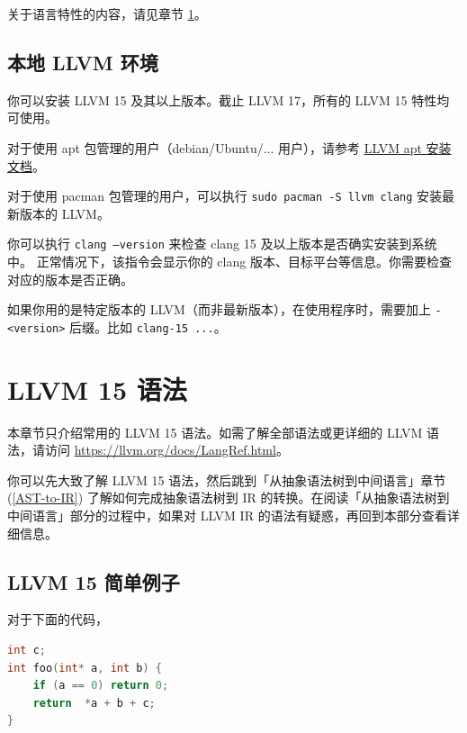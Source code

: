 关于语言特性的内容，请见章节 \ref{LLVM-semantic}。

\subsection{本地 LLVM 环境}

你可以安装 LLVM 15 及其以上版本。截止 LLVM 17，所有的 LLVM 15 特性均可使用。

对于使用 apt 包管理的用户（debian/Ubuntu/... 用户），请参考 \href{https://apt.llvm.org/}{LLVM apt 安装文档}。

对于使用 pacman 包管理的用户，可以执行 \texttt{sudo pacman -S llvm clang} 安装最新版本的 LLVM。

你可以执行 \texttt{clang --version} 来检查 clang 15 及以上版本是否确实安装到系统中。
正常情况下，该指令会显示你的 clang 版本、目标平台等信息。你需要检查对应的版本是否正确。

\begin{remark}
如果你用的是特定版本的 LLVM（而非最新版本），在使用程序时，需要加上 \texttt{-<version>} 后缀。比如 \texttt{clang-15 ...}。
\end{remark}

\section{LLVM 15 语法}\label{LLVM-semantic}

\begin{remark}
本章节只介绍常用的 LLVM 15 语法。如需了解全部语法或更详细的 LLVM 语法，请访问
\url{https://llvm.org/docs/LangRef.html}。
\end{remark}

\begin{remark}
你可以先大致了解 LLVM 15 语法，然后跳到「从抽象语法树到中间语言」章节
(\ref{AST-to-IR}) 了解如何完成抽象语法树到 IR
的转换。在阅读「从抽象语法树到中间语言」部分的过程中，如果对 LLVM IR
的语法有疑惑，再回到本部分查看详细信息。
\end{remark}

\subsection{LLVM 15 简单例子}

对于下面的代码，
\begin{lstlisting}[language=C]
int c;
int foo(int* a, int b) {
    if (a == 0) return 0;
    return  *a + b + c;
}
\end{lstlisting}


